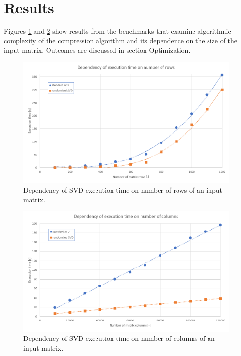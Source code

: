 \section{Results}
\label{sec:results}

Figures \ref{fig:ExeTime_rows} and \ref{fig:ExeTime_columns} show results from the benchmarks that examine algorithmic complexity of the compression algorithm and its dependence on the size of the input matrix. Outcomes are discussed in section Optimization.

\begin{figure}[H]
\centering\includegraphics[width=\textwidth]{figures/executionTime_varyingRows}
\caption{Dependency of SVD execution time on number of rows of an input matrix.}
\label{fig:ExeTime_rows}
\end{figure}

\begin{figure}[H]
\centering\includegraphics[width=\textwidth]{figures/executionTime_varyingColumns}
\caption{Dependency of SVD execution time on number of columns of an input matrix.}
\label{fig:ExeTime_columns}
\end{figure}

